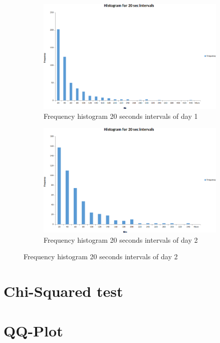 \documentclass{article}
\begin{document}
\begin{figure}[H]
    \begin{subfigure}{0.5\textwidth}
        \includegraphics[width=\linewidth]{day1-hist-20sec.png}
        \caption{Frequency histogram 20 seconds intervals of day 1}
    \end{subfigure}
    \begin{subfigure}{0.5\textwidth}
        \includegraphics[width=\linewidth]{day2-hist-20sec.png}
        \caption{Frequency histogram 20 seconds intervals of day 2}
    \end{subfigure}
\end{figure}

\section{Chi-Squared test}

\section{QQ-Plot}
\end{document}
